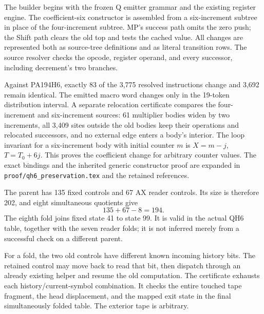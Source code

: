 \documentclass[11pt,letterpaper]{article}
\newcommand{\file}[1]{\texttt{\nolinkurl{#1}}}
\begin{document}
The builder begins with the frozen Q emitter grammar and the existing
register engine. The coefficient-six constructor is assembled from a
six-increment subtree in place of the four-increment subtree. MP's success
path omits the zero push; the Shift path clears the old top and tests the
cached value. All changes are represented both as source-tree definitions
and as literal transition rows. The source resolver checks the opcode,
register operand, and every successor, including decrement's two branches.

Against PA194H6, exactly 83 of the 3,775 resolved instructions change and
3,692 remain identical. The emitted macro word changes only in the
19-token distribution interval. A separate relocation certificate compares
the four-increment and six-increment sources: 61 multiplier bodies widen
by two increments, all 3,409 sites outside the old bodies keep their
operations and relocated successors, and no external edge enters a body's
interior. The loop invariant for a six-increment body with initial counter
\(m\) is \(X=m-j\), \(T=T_0+6j\). This proves the coefficient change for
arbitrary counter values. The exact bindings and the inherited generic
constructor proof are expanded in \file{proof/qh6_preservation.tex} and
the retained references.

The parent has 135 fixed controls and 67 AX reader controls. Its size is
therefore 202, and eight simultaneous quotients give
\[
 \boxed{135+67-8=194.}
\]
The eighth fold joins fixed state 41 to state 99. It is valid in the actual
QH6 table, together with the seven reader folds; it is not inferred merely
from a successful check on a different parent.



For a fold, the two old controls have different known incoming history
bits. The retained control may move back to read that bit, then dispatch
through an already existing helper and resume the old computation.
The certificate exhausts each history/current-symbol combination. It
checks the entire touched tape fragment, the head displacement, and the
mapped exit state in the final simultaneously folded table. The exterior
tape is arbitrary.
\end{document}
